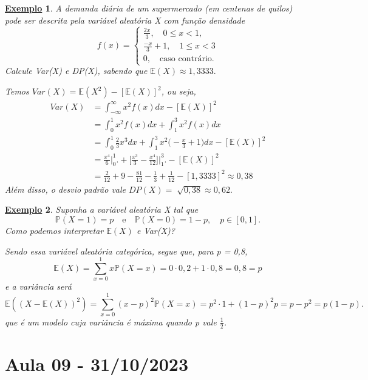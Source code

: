 \documentclass{article}
\newtheorem{example}{\underline{Exemplo}}
\begin{document}
\begin{example}
 A demanda diária de um supermercado (em centenas de quilos) pode ser descrita pela variável aleatória X com função densidade 
  \[
    f(x) = \left\{\begin{array}{ll}
        \frac{2x}{3},\quad 0\leq x <1,\\
        \frac{-x}{3} + 1,\quad 1\leq x <3\\
        0,\quad \text{caso contrário}.
      \end{array}\right.
  \]
Calcule Var(X) e DP(X), sabendo que \(\mathbb{E}(X)\approx 1,3333.\)

Temos \(Var(X) = \mathbb{E}(X^{2}) - [\mathbb{E}(X)]^{2}\), ou seja, 
\begin{align*}
  Var(X) &= \int_{-\infty}^{\infty}x^{2}f(x)dx - [\mathbb{E}(X)]^{2}\\
         &= \int_{0}^{1}x^{2}f(x)dx + \int_{1}^{3}x^{2}f(x)dx\\
         &= \int_{0}^{1}\frac{2}{3}x^{3}dx + \int_{1}^{3}x^{2}\biggl(-\frac{x}{3}+1\biggr)dx - [\mathbb{E}(X)]^{2}\\
         &= \frac{x^{4}}{6}\biggl|_{0}^{1}\biggr. + \biggl[\frac{x^{3}}{3}-\frac{x^{4}}{12}\biggr]\biggl|_{1}^{3}\biggr. - [\mathbb{E}(X)]^{2}\\
         &= \frac{2}{12} + 9 - \frac{81}{12} - \frac{1}{3} + \frac{1}{12} - [1,3333]^{2}\approx 0,38
\end{align*}
Além disso, o desvio padrão vale \(DP(X) = \sqrt[]{0,38}\approx 0,62.\)
\end{example}
\begin{example}
 Suponha a variável aleatória X tal que 
   \[
     \mathbb{P}(X=1) = p\quad\text{e}\quad \mathbb{P}(X=0) = 1-p,\quad p\in [0, 1].
   \]
Como podemos interpretar \(\mathbb{E}(X)\) e Var(X)?

Sendo essa variável aleatória categórica, segue que, para p = 0,8,
  \[
    \mathbb{E}(X) = \sum\limits_{x=0}^{1}x \mathbb{P}(X=x) = 0 \cdot 0,2 + 1 \cdot 0,8 = 0,8 = p
  \]
e a variância será 
  \[
    \mathbb{E}((X-\mathbb{E}(X))^{2}) = \sum\limits_{x=0}^{1}(x-p)^{2}\mathbb{P}(X=x) = p^{2}\cdot 1 + (1-p)^{2}p = p - p^{2} = p(1-p).
  \]
que é um modelo cuja variância é máxima quando p vale \(\frac{1}{2}\).
\end{example}
\newpage

\section{Aula 09 - 31/10/2023}
\end{document}
